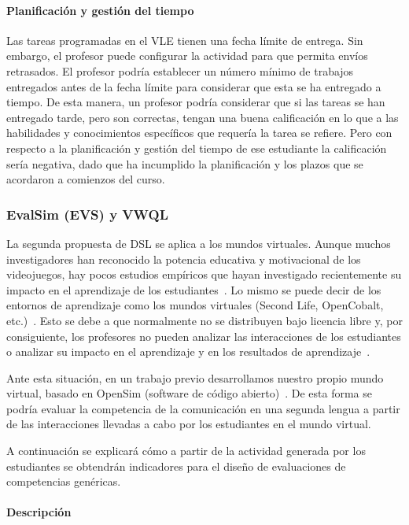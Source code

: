 				\paragraph*{Planificación y gestión del tiempo}
				Las tareas programadas en el VLE tienen una fecha límite de entrega. Sin embargo, el profesor puede configurar la actividad para que permita envíos retrasados. El profesor podría establecer un número mínimo de trabajos entregados antes de la fecha límite para considerar que esta se ha entregado a tiempo. De esta manera, un profesor podría considerar que si las tareas se han entregado tarde, pero son correctas, tengan una buena calificación en lo que a las habilidades y conocimientos específicos que requería la tarea se refiere. Pero con respecto a la planificación y gestión del tiempo de ese estudiante la calificación sería negativa, dado que ha incumplido la planificación y los plazos que se acordaron a comienzos del curso.

		\subsubsection{EvalSim (EVS) y VWQL} \label{subcha:evs}

		La segunda propuesta de DSL se aplica a los mundos virtuales. Aunque muchos investigadores han reconocido la potencia educativa y motivacional de los videojuegos, hay pocos estudios empíricos que hayan investigado recientemente su impacto en el aprendizaje de los estudiantes~\cite{berns2013game}. Lo mismo se puede decir de los entornos de aprendizaje como los mundos virtuales (Second Life, OpenCobalt, etc.)~\cite{hew2010use}. Esto se debe a que normalmente no se distribuyen bajo licencia libre y, por consiguiente, los profesores no pueden analizar las interacciones de los estudiantes o analizar su impacto en el aprendizaje y en los resultados de aprendizaje~\cite{cruz2015discovering,moreno2014serious}. 

		Ante esta situación, en un trabajo previo desarrollamos nuestro propio mundo virtual, basado en OpenSim (software de código abierto)~\cite{berns2013using}. De esta forma se podría evaluar la competencia de la comunicación en una segunda lengua a partir de las interacciones llevadas a cabo por los estudiantes en el mundo virtual.

		A continuación se explicará cómo a partir de la actividad generada por los estudiantes se obtendrán indicadores para el diseño de evaluaciones de competencias genéricas.

			\paragraph{Descripción}

